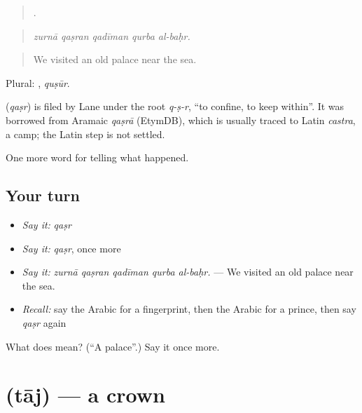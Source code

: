 \begin{quote}
    .
\end{quote}

\begin{quote}
\emph{zurnā qaṣran qadīman qurba al-baḥr.}
\end{quote}

\begin{quote}
We visited an old palace near the sea.
\end{quote}

Plural: , \emph{quṣūr}.

\begin{cousinweb}
\textbf{} (\emph{qaṣr}) is filed by Lane under the root \emph{q-ṣ-r}, \textquotedblleft{}to confine, to keep within\textquotedblright{}. It was borrowed from Aramaic \emph{qaṣrā} (EtymDB), which is usually traced to Latin \emph{castra}, a camp; the Latin step is not settled.
\end{cousinweb}

\begin{grammarlens}[title={What you've built}]
One more word for telling what happened.
\end{grammarlens}

\subsection*{Your turn}
\begin{itemize}
\raggedright
  \item \emph{Say it:} \emph{qaṣr}
  \item \emph{Say it:} \emph{qaṣr}, once more
  \item \emph{Say it:} \emph{zurnā qaṣran qadīman qurba al-baḥr.} — We visited an old palace near the sea.
  \item \emph{Recall:} say the Arabic for a fingerprint, then the Arabic for a prince, then say \emph{qaṣr} again
\end{itemize}

\begin{tcolorbox}[breakable,colback=teal!4,colframe=teal!35!black,title={Before you move on}]
What does  mean? (\textquotedblleft{}A palace\textquotedblright{}.) Say it once more.
\end{tcolorbox}
\section[\texorpdfstring{\ar{تاج} (tāj)}{تاج (tāj)}]{ (tāj) — a crown}

